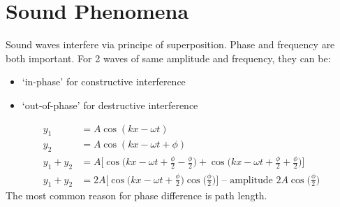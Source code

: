 \documentclass[a4paper, 11pt, normalem]{report}
\begin{document}
\section{Sound Phenomena}
Sound waves interfere via principe of superposition.
Phase and frequency are both important.
For 2 waves of same amplitude and frequency, they can be:
\begin{itemize}
    \item `in-phase' for constructive interference
    \item `out-of-phase' for destructive interference
\end{itemize}
\begin{align}
    y_{1} &= A\cos{(kx - \omega t)} \\
    y_{2} &= A\cos{(kx - \omega t + \phi)}\\
    y_{1} + y_{2} &= A\Big[\cos{\Big(kx - \omega t + \frac{\phi}{2} - \frac{\phi}{2}\Big)} + \cos{\Big(kx - \omega t + \frac{\phi}{2} + \frac{\phi}{2}\Big)}\Big] \\
    y_{1} + y_{2} &= 2A\Big[\cos{\Big(kx - \omega t + \frac{\phi}{2}\Big)}\cos{\Big(\frac{\phi}{2}\Big)}\Big]\text{ -- amplitude }2A\cos{\Big(\frac{\phi}{2}\Big)}
\end{align}
The most common reason for phase difference is path length.
\end{document}
